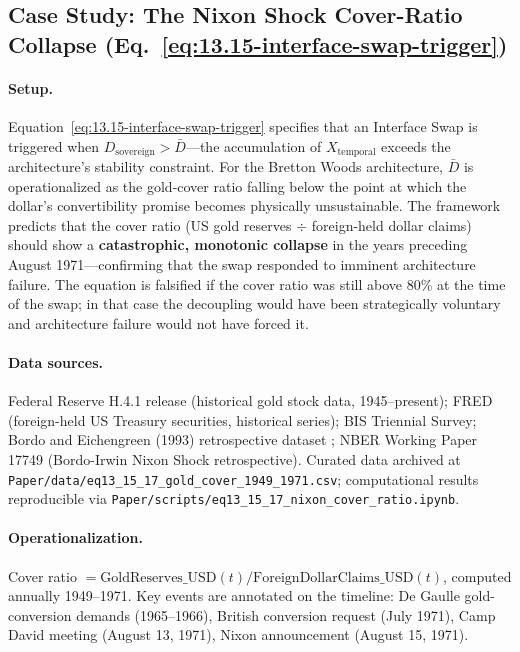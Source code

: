 \subsection*{Case Study: The Nixon Shock Cover-Ratio Collapse (Eq.~\eqref{eq:13.15-interface-swap-trigger})}
\label{cs:nixon_cover}

\paragraph{Setup.}
Equation~\eqref{eq:13.15-interface-swap-trigger} specifies that an Interface Swap is triggered when $D_{\text{sovereign}} > \bar{D}$---the accumulation of $X_{\text{temporal}}$ exceeds the architecture's stability constraint. For the Bretton Woods architecture, $\bar{D}$ is operationalized as the gold-cover ratio falling below the point at which the dollar's convertibility promise becomes physically unsustainable. The framework predicts that the cover ratio (US gold reserves $\div$ foreign-held dollar claims) should show a \textbf{catastrophic, monotonic collapse} in the years preceding August 1971---confirming that the swap responded to imminent architecture failure. The equation is falsified if the cover ratio was still above 80\% at the time of the swap; in that case the decoupling would have been strategically voluntary and architecture failure would not have forced it.

\paragraph{Data sources.}
Federal Reserve H.4.1 release (historical gold stock data, 1945--present); FRED (foreign-held US Treasury securities, historical series); BIS Triennial Survey; Bordo and Eichengreen (1993) retrospective dataset \cite{bordo_eichengreen_1993}; NBER Working Paper 17749 (Bordo-Irwin Nixon Shock retrospective). Curated data archived at \texttt{Paper/data/eq13\_15\_17\_gold\_cover\_1949\_1971.csv}; computational results reproducible via \texttt{Paper/scripts/eq13\_15\_17\_nixon\_cover\_ratio.ipynb}.

\paragraph{Operationalization.}
Cover ratio $= \mathrm{GoldReserves\_USD}(t) / \mathrm{ForeignDollarClaims\_USD}(t)$, computed annually 1949--1971. Key events are annotated on the timeline: De Gaulle gold-conversion demands (1965--1966), British conversion request (July 1971), Camp David meeting (August 13, 1971), Nixon announcement (August 15, 1971).

